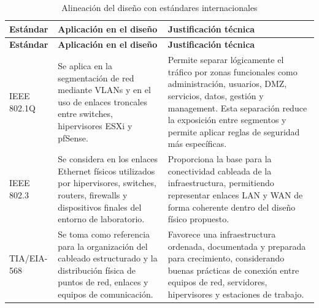 \documentclass[11pt, a4paper, oneside]{report}
\begin{document}
\begin{xltabular}{\textwidth}{@{}|L{3cm}|X|X|@{}}
\caption{Alineación del diseño con estándares internacionales}
\label{tab:alineacion_estandares_internacionales} \\

\parbox[c][1.1cm][c]{\linewidth}{\centering\color{white}\bfseries\small Estándar} &
\parbox[c][1.1cm][c]{\linewidth}{\centering\color{white}\bfseries\small Aplicación en el diseño} &
\parbox[c][1.1cm][c]{\linewidth}{\centering\color{white}\bfseries\small Justificación técnica} \\ \hline
\endfirsthead

\parbox[c][1.1cm][c]{\linewidth}{\centering\color{white}\bfseries\small Estándar} &
\parbox[c][1.1cm][c]{\linewidth}{\centering\color{white}\bfseries\small Aplicación en el diseño} &
\parbox[c][1.1cm][c]{\linewidth}{\centering\color{white}\bfseries\small Justificación técnica} \\ \hline
\endhead

\hline
\endfoot

{\small IEEE 802.1Q\newline \cite{ieee8021q}} &
{\small Se aplica en la segmentación de red mediante VLANs y en el uso de enlaces troncales entre switches, hipervisores ESXi y pfSense.} &
{\small Permite separar lógicamente el tráfico por zonas funcionales como administración, usuarios, DMZ, servicios, datos, gestión y management. Esta separación reduce la exposición entre segmentos y permite aplicar reglas de seguridad más específicas.} \\ \hline

{\small IEEE 802.3} &
{\small Se considera en los enlaces Ethernet físicos utilizados por hipervisores, switches, routers, firewalls y dispositivos finales del entorno de laboratorio.} &
{\small Proporciona la base para la conectividad cableada de la infraestructura, permitiendo representar enlaces LAN y WAN de forma coherente dentro del diseño físico propuesto.} \\ \hline

{\small TIA/EIA-568\newline \cite{tiaeia568c2}} &
{\small Se toma como referencia para la organización del cableado estructurado y la distribución física de puntos de red, enlaces y equipos de comunicación.} &
{\small Favorece una infraestructura ordenada, documentada y preparada para crecimiento, considerando buenas prácticas de conexión entre equipos de red, servidores, hipervisores y estaciones de trabajo.} \\ \hline


\end{xltabular}
\end{document}
